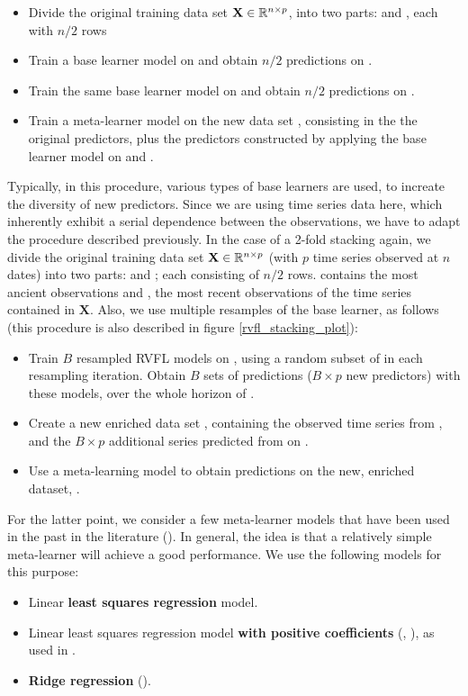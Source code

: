 \begin{itemize}
\item Divide the original training data set $\textbf{X} \in \mathbb{R}^{n \times p}$, into two parts:  and , each with $n/2$ rows
\item Train a base learner model on  and obtain $n/2$ predictions on .
\item Train the same base learner model on  and obtain $n/2$ predictions on .
\item Train a  meta-learner model on the new data set , consisting in the the original predictors, plus the predictors constructed by applying the base learner model on  and .
\end{itemize}
\medskip

Typically, in this procedure, various types of base learners are used, to increate the diversity of new predictors. Since we are using time series data here, which inherently exhibit a serial dependence between the observations, we have to adapt the procedure described previously. In the case of a 2-fold stacking again, we divide the original training data set  $\textbf{X} \in \mathbb{R}^{n \times p}$ (with $p$ time series observed at $n$ dates) into two parts:  and ; each consisting of $n/2$ rows.  contains the most ancient observations and , the most recent observations of the time series contained in $\textbf{X}$. Also, we use multiple resamples of the base learner, as follows (this procedure is also described in figure \ref{rvfl_stacking_plot}):

\begin{itemize}
\item Train $B$ resampled RVFL models on , using a random subset of  in each resampling iteration. Obtain $B$ sets of predictions ($B \times p$ new predictors) with these models, over the whole horizon  of .
\item Create a new enriched data set , containing the observed time series from , and the $B \times p$ additional series predicted from  on .
\item Use a meta-learning model to obtain predictions on the new, enriched dataset, .
\end{itemize}

For the latter point, we consider a few meta-learner models that have been used in the past in the literature (\cite{breiman1996stacked}). In general, the idea is that a relatively simple meta-learner will achieve a good performance. We use the following models for this purpose:
\begin{itemize}
\item Linear \textbf{least squares regression} model.
\item Linear least squares regression model \textbf{with positive coefficients} (\cite{lawson1974solving}, \cite{lawson1995solving}), as used in \cite{breiman1996stacked}.
\item \textbf{Ridge regression} (\cite{hoerl1970ridge}).
\end{itemize}

